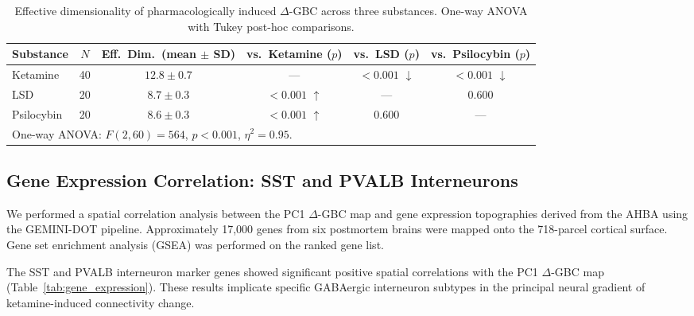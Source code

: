 \documentclass[11pt]{article}
\begin{document}
\begin{table}[H]
\centering
\caption{Effective dimensionality of pharmacologically induced $\Delta$-GBC across three substances. One-way ANOVA with Tukey post-hoc comparisons.}
\label{tab:dimensionality}
\begin{tabular}{lccccc}
\toprule
\textbf{Substance} & \textbf{$N$} & \textbf{Eff.\ Dim.\ (mean $\pm$ SD)} & \textbf{vs.\ Ketamine ($p$)} & \textbf{vs.\ LSD ($p$)} & \textbf{vs.\ Psilocybin ($p$)} \\
\midrule
Ketamine & 40 & $12.8 \pm 0.7$ & --- & $< 0.001$ $\downarrow$ & $< 0.001$ $\downarrow$ \\
LSD & 20 & $8.7 \pm 0.3$ & $< 0.001$ $\uparrow$ & --- & 0.600 \\
Psilocybin & 20 & $8.6 \pm 0.3$ & $< 0.001$ $\uparrow$ & 0.600 & --- \\
\bottomrule
\multicolumn{6}{l}{\small One-way ANOVA: $F(2,60) = 564$, $p < 0.001$, $\eta^2 = 0.95$.} \\
\end{tabular}
\end{table}

\subsection{Gene Expression Correlation: SST and PVALB Interneurons}

We performed a spatial correlation analysis between the PC1 $\Delta$-GBC map and gene expression topographies derived from the AHBA using the GEMINI-DOT pipeline. Approximately 17,000 genes from six postmortem brains were mapped onto the 718-parcel cortical surface. Gene set enrichment analysis (GSEA) \citep{subramanian2005} was performed on the ranked gene list.

The SST and PVALB interneuron marker genes showed significant positive spatial correlations with the PC1 $\Delta$-GBC map (Table~\ref{tab:gene_expression}). These results implicate specific GABAergic interneuron subtypes in the principal neural gradient of ketamine-induced connectivity change.
\end{document}
